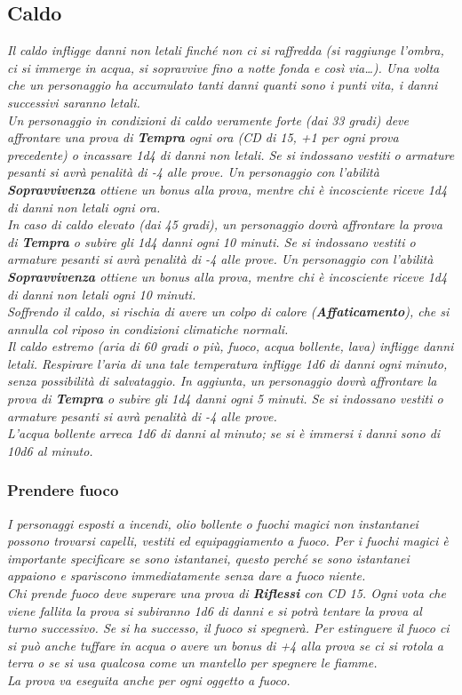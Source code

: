		\subsection{Caldo}
			\emph{Il caldo infligge danni non letali finché non ci si raffredda (si raggiunge l'ombra, ci si immerge in acqua, si sopravvive fino a notte fonda e così via\dots). Una volta che un personaggio ha accumulato tanti danni quanti sono i punti vita, i danni successivi saranno letali.\\
			Un personaggio in condizioni di caldo veramente forte (dai 33 gradi) deve affrontare una prova di \textbf{Tempra} ogni ora (CD di 15, +1 per ogni prova precedente) o incassare \textit{1d4} di danni non letali. Se si indossano vestiti o armature pesanti si avrà penalità di -4 alle prove. Un personaggio con l'abilità \textbf{Sopravvivenza} ottiene un bonus alla prova, mentre chi è incosciente riceve \textit{1d4} di danni non letali ogni ora.\\
			In caso di caldo elevato (dai 45 gradi), un personaggio dovrà affrontare la prova di \textbf{Tempra} o subire gli \textit{1d4} danni ogni 10 minuti. Se si indossano vestiti o armature pesanti si avrà penalità di -4 alle prove. Un personaggio con l'abilità \textbf{Sopravvivenza} ottiene un bonus alla prova, mentre chi è incosciente riceve \textit{1d4} di danni non letali ogni 10 minuti.\\
			Soffrendo il caldo, si rischia di avere un colpo di calore (\textbf{Affaticamento}), che si annulla col riposo in condizioni climatiche normali.\\
			Il caldo estremo (aria di 60 gradi o più, fuoco, acqua bollente, lava) infligge danni letali. Respirare l'aria di una tale temperatura infligge \textit{1d6} di danni ogni minuto, senza possibilità di salvataggio. In aggiunta, un personaggio dovrà affrontare la prova di \textbf{Tempra} o subire gli \textit{1d4} danni ogni 5 minuti. Se si indossano vestiti o armature pesanti si avrà penalità di -4 alle prove.\\
			L'acqua bollente arreca \textit{1d6} di danni al minuto; se si è immersi i danni sono di \textit{10d6} al minuto.}
				\subsubsection{Prendere fuoco}
					\emph{I personaggi esposti a incendi, olio bollente o fuochi magici non instantanei possono trovarsi capelli, vestiti ed equipaggiamento a fuoco. Per i fuochi magici è importante specificare se sono istantanei, questo perché se sono istantanei appaiono e spariscono immediatamente senza dare a fuoco niente.\\
					Chi prende fuoco deve superare una prova di \textbf{Riflessi} con CD 15. Ogni vota che viene fallita la prova si subiranno \textit{1d6} di danni e si potrà tentare la prova al turno successivo. Se si ha successo, il fuoco si spegnerà. Per estinguere il fuoco ci si può anche tuffare in acqua o avere un bonus di +4 alla prova se ci si rotola a terra o se si usa qualcosa come un mantello per spegnere le fiamme.\\	
					La prova va eseguita anche per ogni oggetto a fuoco.}
